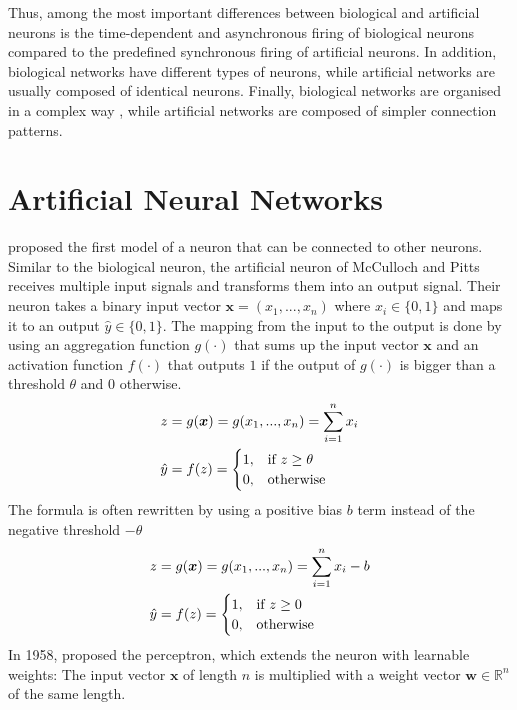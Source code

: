 Thus, among the most important differences between biological and artificial neurons is the time-dependent and asynchronous firing of biological neurons compared to the predefined synchronous firing of artificial neurons. In addition, biological networks have different types of neurons, while artificial networks are usually composed of identical neurons. Finally, biological networks are organised in a complex way , while artificial networks are composed of simpler connection patterns.

\section{Artificial Neural Networks}
 proposed the first model of a neuron that can be connected to other neurons.
Similar to the biological neuron, the artificial neuron of McCulloch and Pitts receives multiple input signals and transforms them into an output signal.
Their neuron takes a binary input vector $\boldsymbol{x} = (x_1, ..., x_n)$ where $x_i \in \{0, 1\}$ and maps it to an output $\hat{y} \in \{0, 1\}$.
The mapping from the input to the output is done by using an aggregation function $g(\cdot)$ that sums up the input vector $\boldsymbol{x}$ and an activation function $f(\cdot)$ that outputs $1$ if the output of $g(\cdot)$ is bigger than a threshold $\theta$ and $0$ otherwise.
%
\begin{align}\eqlbl{McCulloch_Pitts_agg}%
	z &= g(\boldsymbol{x}) = g(x_1, ..., x_n) = \sum_{i=1}^{n}x_i\\
		\hat{y} &= f(z) = \begin{cases}
      		1, & \text{if}\ z \geq \theta \\
      		0, & \text{otherwise}
    	\end{cases}
\end{align}
%
The formula is often rewritten by using a positive  bias $b$ term instead of the negative threshold $- \theta$
%
\begin{align}\eqlbl{McCulloch_Pitts_agg}%
	z &= g(\boldsymbol{x}) = g(x_1, ..., x_n) = \sum_{i=1}^{n}x_i-b\\
		\hat{y} &= f(z) = \begin{cases}
      		1, & \text{if}\ z \geq 0 \\
      		0, & \text{otherwise}
    	\end{cases}
\end{align}
%
In 1958,  proposed the perceptron, which extends the neuron with learnable weights: The input vector $\boldsymbol{x}$ of length $n$ is multiplied with a weight vector $\boldsymbol{w} \in \mathbb{R}^n$ of the same length.
